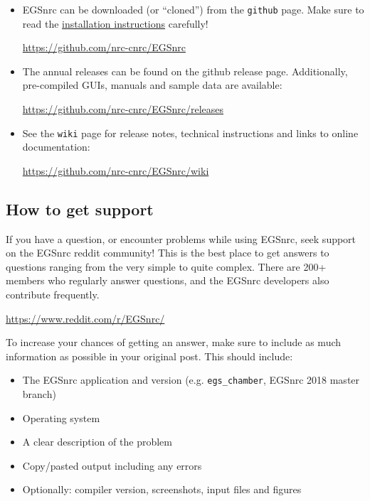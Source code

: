 \documentclass[12pt,twoside]{article}
\begin{document}
\begin{itemize}
\item EGSnrc can be downloaded (or ``cloned'') from the \Verb+github+ page. Make sure
to read the \href{https://github.com/nrc-cnrc/EGSnrc/wiki/Installation-overview}{installation instructions} carefully!

\href{https://github.com/nrc-cnrc/EGSnrc}{https://github.com/nrc-cnrc/EGSnrc}

\item The annual releases can be found on the github release page. Additionally,
pre-compiled GUIs, manuals and sample data are available:

\href{https://github.com/nrc-cnrc/EGSnrc/releases}{https://github.com/nrc-cnrc/EGSnrc/releases}

\item See the \Verb+wiki+ page for release notes, technical instructions and links to online documentation:

\href{https://github.com/nrc-cnrc/EGSnrc/wiki}{https://github.com/nrc-cnrc/EGSnrc/wiki}
\end{itemize}

\subsection{How to get support}
If you have a question, or encounter problems while using EGSnrc, 
seek support on the EGSnrc reddit community! This is the best place 
to get answers to questions ranging from the very simple to quite 
complex. There are 200+ members who regularly answer questions, and 
the EGSnrc developers also contribute frequently.

\href{https://www.reddit.com/r/EGSnrc/}{https://www.reddit.com/r/EGSnrc/}

To increase your chances of getting an answer, make sure to include as much information as possible in your original post. This should include:
\begin{itemize}
\item The EGSnrc application and version (e.g. \Verb+egs_chamber+, EGSnrc 2018 master branch)
\item Operating system
\item A clear description of the problem
\item Copy/pasted output including any errors
\item Optionally: compiler version, screenshots, input files and figures
\end{itemize}
\end{document}
